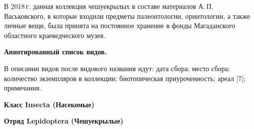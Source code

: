 В 2018\,г. данная коллекция чешуекрылых в составе материалов А.\,П.\,Вась\-ковского, в которые входили предметы палеонтологии, орнитологии, а также личные вещи, была принята на постоянное хранение в фонды Магаданского областного краеведческого музея.

\textbf{Аннотированный список видов.}

В описании видов после видового названия идут: дата сбора; место сбора; количество экземпляров в коллекции; биотопическая приуроченность; ареал [7]; примечания.
\vspace{-6pt}
\begin{center}
\textbf{Класс Insecta (Насекомые)}

\textbf{Отряд Lepidoptera (Чешуекрылые)}
\end{center}

\vspace{-8pt}
